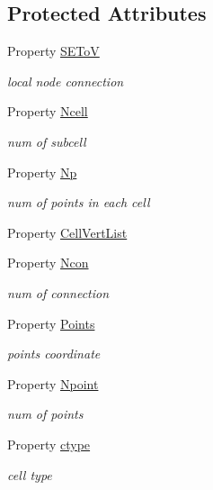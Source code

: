 \subsection*{Protected Attributes}
\begin{DoxyCompactItemize}
\item 
Property \hyperlink{class_abstract_vtk_output_a98e917a839500981878bc18d1d10e786}{S\+E\+ToV}
\begin{DoxyCompactList}\small\item\em local node connection \end{DoxyCompactList}\item 
Property \hyperlink{class_abstract_vtk_output_a981247d7d35ced967beaabf6f8a13310}{Ncell}
\begin{DoxyCompactList}\small\item\em num of subcell \end{DoxyCompactList}\item 
Property \hyperlink{class_abstract_vtk_output_a9f50ccbd7b0b5882df20364c658bce2d}{Np}
\begin{DoxyCompactList}\small\item\em num of points in each cell \end{DoxyCompactList}\item 
Property \hyperlink{class_abstract_vtk_output_a600122d74bc259275e02184b66ad55f9}{Cell\+Vert\+List}
\item 
Property \hyperlink{class_abstract_vtk_output_a95afcde0edded29f8fbf3aa1cba43336}{Ncon}
\begin{DoxyCompactList}\small\item\em num of connection \end{DoxyCompactList}\item 
Property \hyperlink{class_abstract_vtk_output_a670d942756e3bcd26d401d61c4c23b28}{Points}
\begin{DoxyCompactList}\small\item\em points coordinate \end{DoxyCompactList}\item 
Property \hyperlink{class_abstract_vtk_output_ab2dbaa1b6f7bd471c00b94942d3ebf45}{Npoint}
\begin{DoxyCompactList}\small\item\em num of points \end{DoxyCompactList}\item 
Property \hyperlink{class_abstract_vtk_output_a5fa1b4a23f4ef382a94463f5c736ba77}{ctype}
\begin{DoxyCompactList}\small\item\em cell type \end{DoxyCompactList}\end{DoxyCompactItemize}


